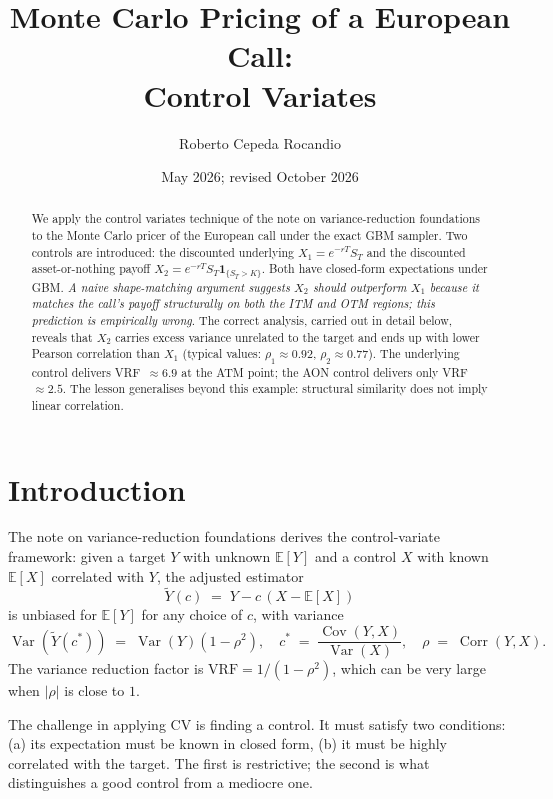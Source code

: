 \documentclass[11pt,a4paper]{article}
\title{Monte Carlo Pricing of a European Call:\\
       Control Variates}
\author{Roberto Cepeda Rocandio}
\date{May 2026; revised October 2026}
\theoremstyle{plain}
\theoremstyle{definition}
\theoremstyle{remark}
\newcommand{\E}{\mathbb{E}}
\newcommand{\Var}{\operatorname{Var}}
\newcommand{\Cov}{\operatorname{Cov}}
\newcommand{\Corr}{\operatorname{Corr}}
\newcommand{\indic}{\mathbf{1}}
\begin{document}
\maketitle

\begin{abstract}
We apply the control variates technique of the note on
variance-reduction foundations to
the Monte Carlo pricer of the European call under the exact GBM
sampler. Two controls are introduced: the discounted
underlying $X_1 = e^{-rT} S_T$ and the discounted asset-or-nothing
payoff $X_2 = e^{-rT} S_T \indic_{\{S_T > K\}}$. Both have closed-form
expectations under GBM. \emph{A naive shape-matching argument suggests
$X_2$ should outperform $X_1$ because it matches the call's payoff
structurally on both the ITM and OTM regions; this prediction is
empirically wrong}. The correct analysis, carried out in detail below,
reveals that $X_2$ carries excess variance unrelated to the target
and ends up with lower Pearson correlation than $X_1$ (typical
values: $\rho_1 \approx 0.92$, $\rho_2 \approx 0.77$). The underlying
control delivers VRF~$\approx 6.9$ at the ATM point; the AON control
delivers only VRF~$\approx 2.5$. The lesson generalises beyond this
example: structural similarity does not imply linear correlation.
\end{abstract}

\tableofcontents

\section{Introduction}
\label{sec:intro}

The note on variance-reduction foundations derives the control-variate
framework: given a target $Y$
with unknown $\E[Y]$ and a control $X$ with known $\E[X]$ correlated
with $Y$, the adjusted estimator
\begin{equation}
\tilde Y(c) \;=\; Y - c\,(X - \E[X])
\end{equation}
is unbiased for $\E[Y]$ for any choice of $c$, with variance
\begin{equation}
\Var(\tilde Y(c^*)) \;=\; \Var(Y)(1 - \rho^2),
\quad
c^* \;=\; \frac{\Cov(Y, X)}{\Var(X)},
\quad
\rho \;=\; \Corr(Y, X).
\end{equation}
The variance reduction factor is $\mathrm{VRF} = 1/(1 - \rho^2)$,
which can be very large when $|\rho|$ is close to $1$.

The challenge in applying CV is finding a control. It must satisfy
two conditions: (a) its expectation must be known in closed form, (b)
it must be highly correlated with the target. The first is
restrictive; the second is what distinguishes a good control from a
mediocre one.
\end{document}
